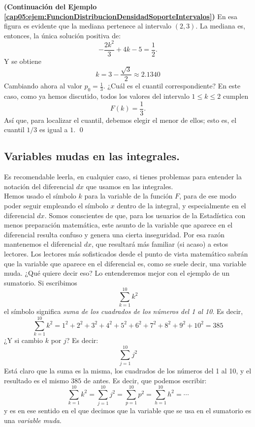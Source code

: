 \begin{ejemplo}{\bf (Continuación del Ejemplo \ref{cap05:ejem:FuncionDistribucionDensidadSoporteIntervalos})}
En esa figura es evidente que la mediana pertenece al intervalo $(2,3)$. La mediana es, entonces, la única solución positiva de:
\[-\dfrac{2 k^2}{3}+4 k-5=\dfrac{1}{2}.\]
Y se obtiene
\[k = 3-\dfrac{\sqrt{3}}{2} \approx 2.1340\]
Cambiando ahora al valor $p_0=\frac{1}{3}$. ¿Cuál es el cuantil correspondiente? En este caso, como ya hemos discutido, todos los valores del intervalo $1\leq k\leq 2$ cumplen
\[F(k)=\dfrac{1}{3}.\]
Así que, para localizar el cuantil, debemos elegir el menor de ellos; esto es, el cuantil $1/3$ es igual a $1$.
\qed
\end{ejemplo}


\subsection{Variables mudas en las integrales.}
\label{cap05:subsec:VariablesMudasIntegrales}
 Es recomendable leerla,
en cualquier caso, si tienes problemas para entender la notación del diferencial $dx$ que usamos en las integrales.\\

Hemos usado el símbolo $k$ para la variable de la función $F$, para de ese modo poder seguir empleando el símbolo $x$ dentro de la integral, y especialmente en el diferencial $dx$. Somos conscientes de que, para los  usuarios de la Estadística con menos preparación matemática, este asunto de la variable que aparece en el diferencial resulta confuso y genera una cierta inseguridad. Por esa razón mantenemos el diferencial $dx$, que resultará más familiar (si acaso) a estos lectores. Los lectores más sofisticados desde el punto de vista matemático sabrán que la variable que aparece en el diferencial es, como se suele decir, una {\sf variable muda}. ¿Qué quiere decir eso? Lo entenderemos mejor con el ejemplo de un sumatorio. Si escribimos
\[\sum_{k=1}^{10} k^2 \]
el símbolo significa {\em suma de los cuadrados de los números del 1 al 10}. Es decir,
\[\sum_{k=1}^{10} k^2 = 1^2 + 2^2 +  3^2 + 4^2 + 5^2 + 6^2 + 7^2 + 8^2 + 9^2 + 10^2 = 385 \]
¿Y si cambio $k$ por $j$? Es decir:
\[\sum_{j=1}^{10} j^2 \]
Está claro que la suma es la misma, los cuadrados de los números del 1 al 10, y el resultado es el mismo $385$ de antes. Es decir, que podemos escribir:
\[\sum_{k=1}^{10} k^2 = \sum_{j=1}^{10} j^2 = \sum_{p=1}^{10} p^2 = \sum_{h=1}^{10} h^2 =\cdots \]
y es en ese sentido en el que decimos que la variable que se usa en el sumatorio es una {\em variable muda}.

